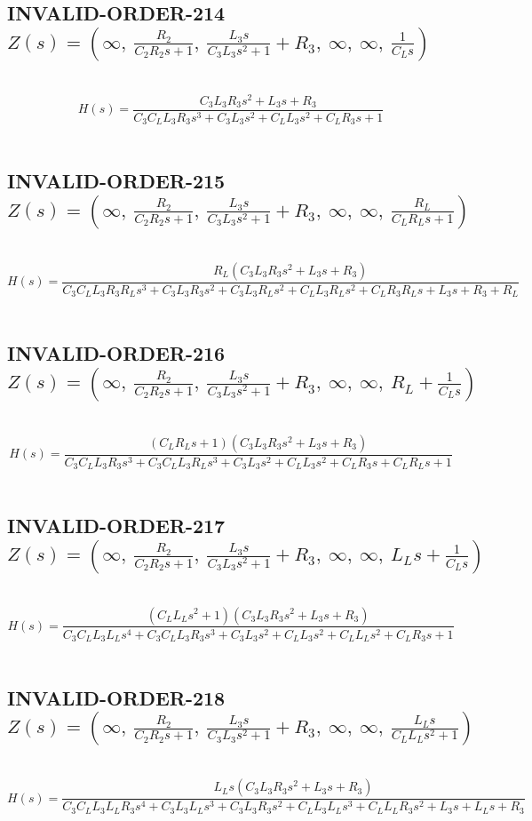 \documentclass{article}
\begin{document}
\subsection{INVALID-ORDER-214 $Z(s) = \left( \infty, \  \frac{R_{2}}{C_{2} R_{2} s + 1}, \  \frac{L_{3} s}{C_{3} L_{3} s^{2} + 1} + R_{3}, \  \infty, \  \infty, \  \frac{1}{C_{L} s}\right)$ } \ 
\textbf{\[H(s) = \frac{C_{3} L_{3} R_{3} s^{2} + L_{3} s + R_{3}}{C_{3} C_{L} L_{3} R_{3} s^{3} + C_{3} L_{3} s^{2} + C_{L} L_{3} s^{2} + C_{L} R_{3} s + 1}\] } \ 
\subsection{INVALID-ORDER-215 $Z(s) = \left( \infty, \  \frac{R_{2}}{C_{2} R_{2} s + 1}, \  \frac{L_{3} s}{C_{3} L_{3} s^{2} + 1} + R_{3}, \  \infty, \  \infty, \  \frac{R_{L}}{C_{L} R_{L} s + 1}\right)$ } \ 
\textbf{\[H(s) = \frac{R_{L} \left(C_{3} L_{3} R_{3} s^{2} + L_{3} s + R_{3}\right)}{C_{3} C_{L} L_{3} R_{3} R_{L} s^{3} + C_{3} L_{3} R_{3} s^{2} + C_{3} L_{3} R_{L} s^{2} + C_{L} L_{3} R_{L} s^{2} + C_{L} R_{3} R_{L} s + L_{3} s + R_{3} + R_{L}}\] } \ 
\subsection{INVALID-ORDER-216 $Z(s) = \left( \infty, \  \frac{R_{2}}{C_{2} R_{2} s + 1}, \  \frac{L_{3} s}{C_{3} L_{3} s^{2} + 1} + R_{3}, \  \infty, \  \infty, \  R_{L} + \frac{1}{C_{L} s}\right)$ } \ 
\textbf{\[H(s) = \frac{\left(C_{L} R_{L} s + 1\right) \left(C_{3} L_{3} R_{3} s^{2} + L_{3} s + R_{3}\right)}{C_{3} C_{L} L_{3} R_{3} s^{3} + C_{3} C_{L} L_{3} R_{L} s^{3} + C_{3} L_{3} s^{2} + C_{L} L_{3} s^{2} + C_{L} R_{3} s + C_{L} R_{L} s + 1}\] } \ 
\subsection{INVALID-ORDER-217 $Z(s) = \left( \infty, \  \frac{R_{2}}{C_{2} R_{2} s + 1}, \  \frac{L_{3} s}{C_{3} L_{3} s^{2} + 1} + R_{3}, \  \infty, \  \infty, \  L_{L} s + \frac{1}{C_{L} s}\right)$ } \ 
\textbf{\[H(s) = \frac{\left(C_{L} L_{L} s^{2} + 1\right) \left(C_{3} L_{3} R_{3} s^{2} + L_{3} s + R_{3}\right)}{C_{3} C_{L} L_{3} L_{L} s^{4} + C_{3} C_{L} L_{3} R_{3} s^{3} + C_{3} L_{3} s^{2} + C_{L} L_{3} s^{2} + C_{L} L_{L} s^{2} + C_{L} R_{3} s + 1}\] } \ 
\subsection{INVALID-ORDER-218 $Z(s) = \left( \infty, \  \frac{R_{2}}{C_{2} R_{2} s + 1}, \  \frac{L_{3} s}{C_{3} L_{3} s^{2} + 1} + R_{3}, \  \infty, \  \infty, \  \frac{L_{L} s}{C_{L} L_{L} s^{2} + 1}\right)$ } \ 
\textbf{\[H(s) = \frac{L_{L} s \left(C_{3} L_{3} R_{3} s^{2} + L_{3} s + R_{3}\right)}{C_{3} C_{L} L_{3} L_{L} R_{3} s^{4} + C_{3} L_{3} L_{L} s^{3} + C_{3} L_{3} R_{3} s^{2} + C_{L} L_{3} L_{L} s^{3} + C_{L} L_{L} R_{3} s^{2} + L_{3} s + L_{L} s + R_{3}}\] } \ 
\end{document}

